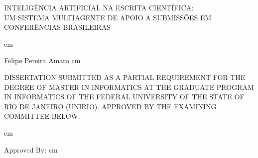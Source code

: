 
\vspace{0.5cm}

\begin{center}
    INTELIGÊNCIA ARTIFICIAL NA ESCRITA CIENTÍFICA: \\
    UM SISTEMA MULTIAGENTE DE APOIO A SUBMISSÕES EM CONFERÊNCIAS BRASILEIRAS

     cm

    Felipe Pereira Amaro
     cm
\end{center}

\vspace{0.5cm}
\noindent

DISSERTATION SUBMITTED AS A PARTIAL REQUIREMENT FOR THE DEGREE OF MASTER IN INFORMATICS AT THE GRADUATE PROGRAM IN INFORMATICS OF THE FEDERAL UNIVERSITY OF THE STATE OF RIO DE JANEIRO (UNIRIO). APPROVED BY THE EXAMINING COMMITTEE BELOW.

 cm

\begin{flushleft}
    Approved By:
     cm

\end{flushleft}

